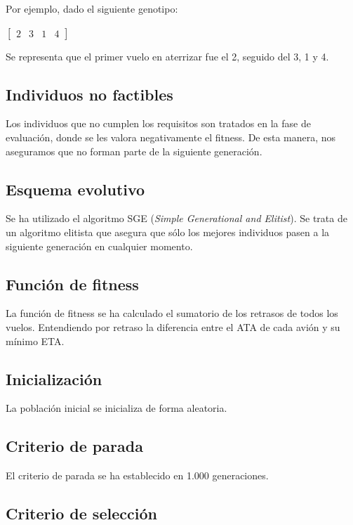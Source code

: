 \documentclass[a4paper,12pt,titlepage]{article}
\begin{document}
Por ejemplo, dado el siguiente genotipo:

\begin{center}
$
\begin{bmatrix}
	2 & 3 & 1 & 4
\end{bmatrix}
$
\end{center}

Se representa que el primer vuelo en aterrizar fue el 2, seguido del 3, 1 y 4.

\subsection{Individuos no factibles}

Los individuos que no cumplen los requisitos son tratados en la fase de evaluación, donde se les valora negativamente el fitness. De esta manera, nos aseguramos que no forman parte de la siguiente generación.

\subsection{Esquema evolutivo}

Se ha utilizado el algoritmo SGE (\textit{Simple Generational and Elitist}). Se trata de un algoritmo elitista que asegura que sólo los mejores individuos pasen a la siguiente generación en cualquier momento.

\subsection{Función de fitness}

La función de fitness se ha calculado el sumatorio de los retrasos de todos los vuelos. Entendiendo por retraso la diferencia entre el ATA de cada avión y su mínimo ETA.

\subsection{Inicialización}

La población inicial se inicializa de forma aleatoria.

\subsection{Criterio de parada}

El criterio de parada se ha establecido en 1.000 generaciones.

\subsection{Criterio de selección}
\end{document}
